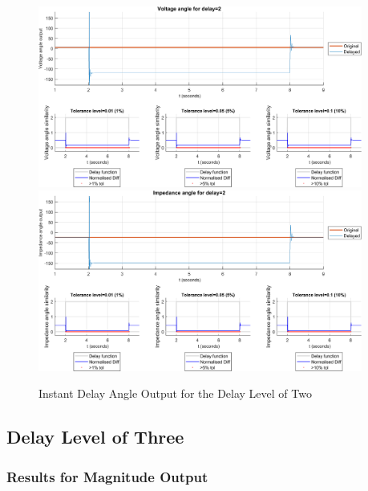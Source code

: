 \begin{figure}
    \caption{Instant Delay Angle Output for the Delay Level of Two}
    \includegraphics[width=0.95\textwidth]{PMUsim-figures/DelayOf_2/Instant_vAngle.png}    
    \includegraphics[width=0.95\textwidth]{PMUsim-figures/DelayOf_2/Instant_iAngle.png}    
    \label{fig:PMUsim_Two_Angle}
        \begin{small}
     \end{small}
\end{figure}


\newpage \subsection{Delay Level of Three}
\subsubsection{Results for Magnitude Output}

